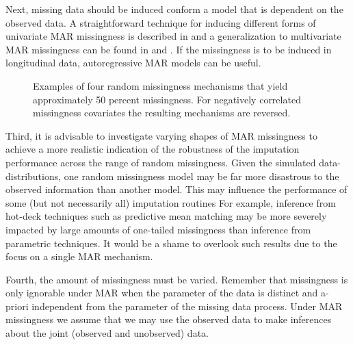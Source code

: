 \documentclass[12pt, a4paper]{article}
\begin{document}
Next, missing data should be induced conform a model that is dependent on the observed data. A straightforward technique for inducing different forms of univariate MAR missingness is described in \citet[][p. 63; see Figure \ref{fig:mar}]{fimd} and a generalization to multivariate MAR missingness can be found in \citet[][Appendix B]{van2006fully} and \citet[][\S 5.2.3]{brand1999development}. If the missingness is to be induced in longitudinal data, autoregressive MAR models \citep[e.g. cf.][model 2 and model 3]{shara2015randomly} can be useful. 

\begin{figure}[t!]
\begin{center}
  \caption{Examples of four random missingness mechanisms that yield approximately 50 percent missingness. For negatively correlated missingness covariates the resulting mechanisms are reversed. }
  \label{fig:mar}
  \end{center}
\end{figure}
Third, it is advisable to investigate varying shapes of MAR missingness to achieve a more realistic indication of the robustness of the imputation performance across the range of random missingness. Given the simulated data-distributions, one random missingness model may be far more disastrous to the observed information than another model. This may influence the performance of some (but not necessarily all) imputation routines For example, inference from  hot-deck techniques such as predictive mean matching \citep{little1988missing, rubin1986statistical} may be more severely impacted by large amounts of one-tailed missingness than inference from parametric techniques. It would be a shame to overlook such results due to the focus on a single MAR mechanism. 

Fourth, the amount of missingness must be varied. Remember that missingness is only ignorable under MAR when the parameter of the data is distinct and a-priori independent from the parameter of the missing data process. Under MAR missingness we assume that we may use the observed data to make inferences about the joint (observed and unobserved) data. 
\end{document}
